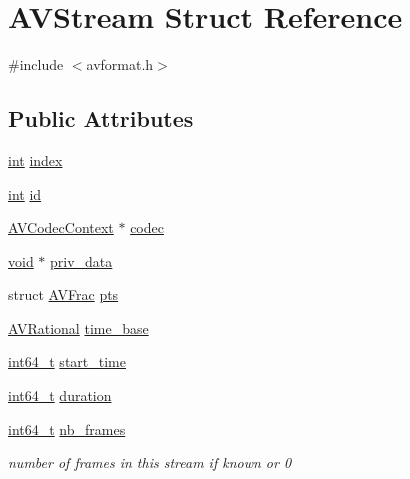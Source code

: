 \hypertarget{struct_a_v_stream}{}\section{A\+V\+Stream Struct Reference}
\label{struct_a_v_stream}


{\ttfamily \#include $<$avformat.\+h$>$}

\subsection*{Public Attributes}
\begin{DoxyCompactItemize}
\item 
\hyperlink{xmltok_8h_a5a0d4a5641ce434f1d23533f2b2e6653}{int} \hyperlink{struct_a_v_stream_a6ca823054632821e085377f7d371a2d1}{index}
\item 
\hyperlink{xmltok_8h_a5a0d4a5641ce434f1d23533f2b2e6653}{int} \hyperlink{struct_a_v_stream_a6873ed62f196c24e8bf282609231786f}{id}
\item 
\hyperlink{struct_a_v_codec_context}{A\+V\+Codec\+Context} $\ast$ \hyperlink{struct_a_v_stream_a56f20051fb99339cc588cd3a07ab8c96}{codec}
\item 
\hyperlink{sound_8c_ae35f5844602719cf66324f4de2a658b3}{void} $\ast$ \hyperlink{struct_a_v_stream_a61b61b0d009be377ebcfdc30ea053d27}{priv\+\_\+data}
\item 
struct \hyperlink{struct_a_v_frac}{A\+V\+Frac} \hyperlink{struct_a_v_stream_afb080896a72650bcb1e613cbb26ef09b}{pts}
\item 
\hyperlink{struct_a_v_rational}{A\+V\+Rational} \hyperlink{struct_a_v_stream_a9db755451f14e2bf590d4b85d82b32e6}{time\+\_\+base}
\item 
\hyperlink{lib-src_2ffmpeg_2win32_2stdint_8h_a67a9885ef4908cb72ce26d75b694386c}{int64\+\_\+t} \hyperlink{struct_a_v_stream_a7c67ae70632c91df8b0f721658ec5377}{start\+\_\+time}
\item 
\hyperlink{lib-src_2ffmpeg_2win32_2stdint_8h_a67a9885ef4908cb72ce26d75b694386c}{int64\+\_\+t} \hyperlink{struct_a_v_stream_a4e04af7a5a4d8298649850df798dd0bc}{duration}
\item 
\hyperlink{lib-src_2ffmpeg_2win32_2stdint_8h_a67a9885ef4908cb72ce26d75b694386c}{int64\+\_\+t} \hyperlink{struct_a_v_stream_a4382c3064df1c9eb232ac198dec067f9}{nb\+\_\+frames}
\begin{DoxyCompactList}\small\item\em number of frames in this stream if known or 0 \end{DoxyCompactList}\item 

\end{DoxyCompactItemize}
